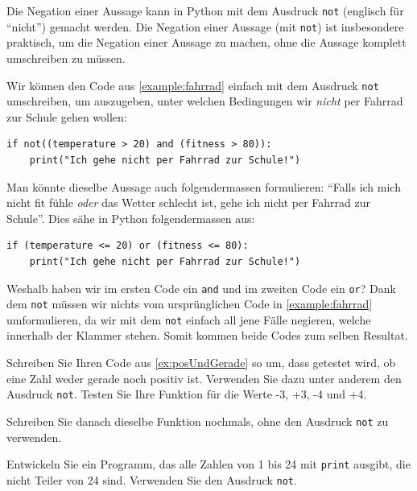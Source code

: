 Die Negation einer Aussage kann in Python mit dem Ausdruck \lstinline|not| (englisch für \enquote{nicht}) gemacht werden. Die Negation einer Aussage (mit \lstinline|not|) ist insbesondere praktisch, um die Negation einer Aussage zu machen, ohne die Aussage komplett umschreiben zu müssen.

\begin{myexample}
Wir können den Code aus \cref{example:fahrrad} einfach mit dem Ausdruck \lstinline|not| umschreiben, um auszugeben, unter welchen Bedingungen wir \textit{nicht} per Fahrrad zur Schule gehen wollen:
\begin{lstlisting}
if not((temperature > 20) and (fitness > 80)):
	print("Ich gehe nicht per Fahrrad zur Schule!")
\end{lstlisting}
Man könnte dieselbe Aussage auch folgendermassen formulieren: \enquote{Falls ich mich nicht fit fühle \textit{oder} das Wetter schlecht ist, gehe ich nicht per Fahrrad zur Schule}. Dies sähe in Python folgendermassen aus:
\begin{lstlisting}
if (temperature <= 20) or (fitness <= 80):
	print("Ich gehe nicht per Fahrrad zur Schule!")
\end{lstlisting}
Weshalb haben wir im ersten Code ein \lstinline|and| und im zweiten Code ein \lstinline|or|? Dank dem \lstinline|not| müssen wir nichts vom ursprünglichen Code in \cref{example:fahrrad} umformulieren, da wir mit dem \lstinline|not| einfach all jene Fälle negieren, welche innerhalb der Klammer stehen. Somit kommen beide Codes zum selben Resultat.
\end{myexample}

\begin{myexercise}
	Schreiben Sie Ihren Code aus \cref{ex:posUndGerade} so um, dass getestet wird, ob eine Zahl weder gerade noch positiv ist. Verwenden Sie dazu unter anderem den Ausdruck \lstinline|not|. Testen Sie Ihre Funktion für die Werte -3, +3, -4 und +4.

	Schreiben Sie danach dieselbe Funktion nochmals, ohne den Ausdruck \lstinline|not| zu verwenden.
	\begin{myanswer}
		
	\end{myanswer}
\end{myexercise}

\begin{myexercise}
	Entwickeln Sie ein Programm, das alle Zahlen von 1 bis 24 mit \lstinline|print| ausgibt, die nicht Teiler von 24 sind. Verwenden Sie den Ausdruck \lstinline|not|.
	\begin{myanswer}
		
	\end{myanswer}
\end{myexercise}

